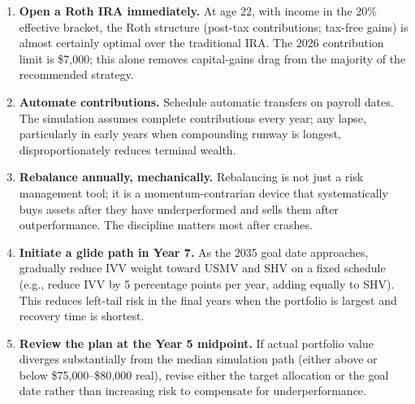 \documentclass[12pt, letterpaper]{article}
\begin{document}
\begin{enumerate}
  \item \textbf{Open a Roth IRA immediately.}  At age 22, with income in the 20\%
    effective bracket, the Roth structure (post-tax contributions; tax-free gains)
    is almost certainly optimal over the traditional IRA.  The 2026 contribution limit
    is \$7{,}000; this alone removes capital-gains drag from the majority of the
    recommended strategy.
  \item \textbf{Automate contributions.}  Schedule automatic transfers on payroll
    dates.  The simulation assumes complete contributions every year; any lapse,
    particularly in early years when compounding runway is longest, disproportionately
    reduces terminal wealth.
  \item \textbf{Rebalance annually, mechanically.}  Rebalancing is not just a risk
    management tool; it is a momentum-contrarian device that systematically buys
    assets after they have underperformed and sells them after outperformance.
    The discipline matters most after crashes.
  \item \textbf{Initiate a glide path in Year 7.}  As the 2035 goal date approaches,
    gradually reduce IVV weight toward USMV and SHV on a fixed schedule (e.g., reduce
    IVV by 5 percentage points per year, adding equally to SHV).  This reduces
    left-tail risk in the final years when the portfolio is largest and recovery time
    is shortest.
  \item \textbf{Review the plan at the Year 5 midpoint.}  If actual portfolio value
    diverges substantially from the median simulation path (either above or below
    \$75{,}000--\$80{,}000 real), revise either the target allocation or the goal date
    rather than increasing risk to compensate for underperformance.
\end{enumerate}
\end{document}
